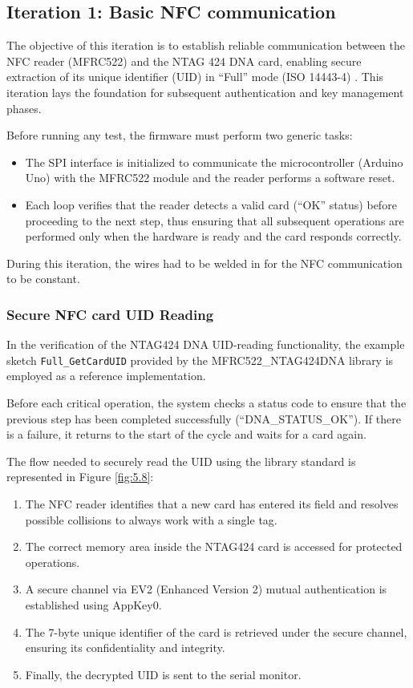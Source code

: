 \subsection{Iteration 1: Basic NFC communication}

The objective of this iteration is to establish reliable communication between the NFC reader (MFRC522) and the NTAG 424 DNA card, enabling secure extraction of its unique identifier (UID) in “Full” mode (ISO 14443-4) \cite{Ref65}. This iteration lays the foundation for subsequent authentication and key management phases.

Before running any test, the firmware must perform two generic tasks:
\begin{itemize}
	\item The SPI interface is initialized to communicate the microcontroller (Arduino Uno) with the MFRC522 module and the reader performs a software reset.
	\item Each loop verifies that the reader detects a valid card (“OK” status) before proceeding to the next step, thus ensuring that all subsequent operations are performed only when the hardware is ready and the card responds correctly.
\end{itemize}


During this iteration, the wires had to be welded in for the NFC communication to be constant.

\subsubsection{Secure NFC card UID Reading}

In the verification of the NTAG424 DNA UID‐reading functionality, the example sketch \texttt{Full\_GetCardUID} provided by the MFRC522\_NTAG424DNA library is employed as a reference implementation. 

Before each critical operation, the system checks a status code to ensure that the previous step has been completed successfully (“DNA\_STATUS\_OK”). If there is a failure, it returns to the start of the cycle and waits for a card again.

The flow needed to securely read the UID using the library standard is represented in Figure \ref{fig:5.8}:
\begin{enumerate}
	\item The NFC reader identifies that a new card has entered its field and resolves possible collisions to always work with a single tag.
	\item The correct memory area inside the NTAG424 card is accessed for protected operations.
	\item A secure channel via EV2 (Enhanced Version 2) mutual authentication is established using AppKey0.
	\item The 7-byte unique identifier of the card is retrieved under the secure channel, ensuring its confidentiality and integrity.
	\item Finally, the decrypted UID is sent to the serial monitor.
\end{enumerate}

